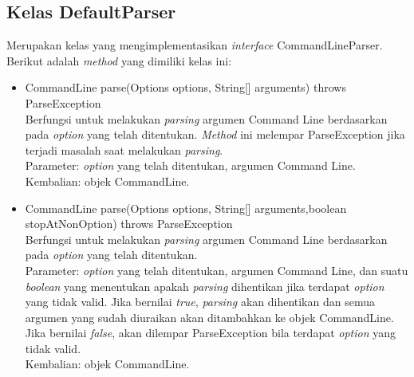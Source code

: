 \subsection{Kelas DefaultParser}
\label{subsec:defaultparser}
Merupakan kelas yang mengimplementasikan \textit{interface} CommandLineParser. Berikut adalah \textit{method} yang dimiliki kelas ini:
\begin{itemize}
\item CommandLine parse(Options options, String[] arguments) throws ParseException\\
Berfungsi untuk melakukan \textit{parsing} argumen Command Line berdasarkan pada \textit{option} yang telah ditentukan. \textit{Method} ini melempar ParseException jika terjadi masalah saat melakukan \textit{parsing}.\\
Parameter: \textit{option} yang telah ditentukan, argumen Command Line.\\
Kembalian: objek CommandLine.

\item CommandLine parse(Options options, String[] arguments,boolean stopAtNonOption) throws ParseException\\
Berfungsi untuk melakukan \textit{parsing} argumen Command Line berdasarkan pada \textit{option} yang telah ditentukan.\\
Parameter: \textit{option} yang telah ditentukan, argumen Command Line, dan suatu \textit{boolean} yang menentukan apakah \textit{parsing} dihentikan jika terdapat \textit{option} yang tidak valid. Jika bernilai \textit{true}, \textit{parsing} akan dihentikan dan semua argumen yang sudah diuraikan akan ditambahkan ke objek CommandLine. Jika bernilai \textit{false}, akan dilempar ParseException bila terdapat \textit{option} yang tidak valid.\\
Kembalian: objek CommandLine.
\end{itemize}

